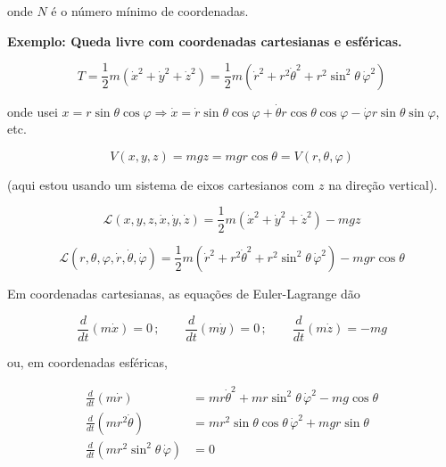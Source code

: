 \begin{enumerate}
onde $N$ é o número mínimo de coordenadas.

\textbf{Exemplo: Queda livre com coordenadas cartesianas e esféricas.}

\begin{equation}
T = \frac{1}{2} m(\dot{x}^2 + \dot{y}^2 + \dot{z}^2) = \frac{1}{2} m\left(\dot{r}^2 + r^2\dot{\theta}^2 + r^2\sin^2\theta\,\dot{\varphi}^2\right)
\label{eq:aula8_energia_cinetica}
\end{equation}

onde usei $x = r\sin\theta\cos\varphi \Rightarrow \dot{x} = \dot{r}\sin\theta\cos\varphi + \dot{\theta} r\cos\theta\cos\varphi - \dot{\varphi} r \sin\theta\sin\varphi$, etc.

\begin{equation}
V(x, y, z) = mgz = mgr\cos\theta = V(r, \theta, \varphi)
\label{eq:aula8_potencial_gravitacional}
\end{equation}

(aqui estou usando um sistema de eixos cartesianos com $z$ na direção vertical).

\begin{equation}
\mathcal{L}(x, y, z, \dot{x}, \dot{y}, \dot{z}) = \frac{1}{2} m(\dot{x}^2 + \dot{y}^2 + \dot{z}^2) - mgz
\label{eq:aula8_lagrangiana_cartesiana}
\end{equation}

\begin{equation}
\mathcal{L}(r, \theta, \varphi, \dot{r}, \dot{\theta}, \dot{\varphi}) = \frac{1}{2} m\left(\dot{r}^2 + r^2\dot{\theta}^2 + r^2\sin^2\theta\,\dot{\varphi}^2\right) - mgr\cos\theta
\label{eq:aula8_lagrangiana_esferica}
\end{equation}

Em coordenadas cartesianas, as equações de Euler-Lagrange dão

\begin{equation}
\frac{d}{dt}(m\dot{x}) = 0\, ; \qquad \frac{d}{dt}(m\dot{y}) = 0\, ; \qquad \frac{d}{dt}(m\dot{z}) = -mg
\label{eq:aula8_el_cartesiana}
\end{equation}

ou, em coordenadas esféricas,

\begin{align}
\frac{d}{dt}(m\dot{r}) &= mr\dot{\theta}^2 + mr\sin^2\theta\,\dot{\varphi}^2 - mg\cos\theta \label{eq:aula8_el_esferica_r}\\
\frac{d}{dt}(mr^2\dot{\theta}) &= mr^2\sin\theta\cos\theta\,\dot{\varphi}^2 + mgr\sin\theta \label{eq:aula8_el_esferica_theta}\\
\frac{d}{dt}\left(mr^2\sin^2\theta\,\dot{\varphi}\right) &= 0 \label{eq:aula8_el_esferica_phi}
\end{align}


\end{enumerate}
